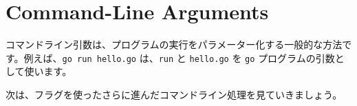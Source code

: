 \section{Command-Line Arguments}

コマンドライン引数は、プログラムの実行をパラメーター化する一般的な方法です。例えば、\texttt{go run hello.go} は、\texttt{run} と \texttt{hello.go} を \texttt{go} プログラムの引数として使います。




次は、フラグを使ったさらに進んだコマンドライン処理を見ていきましょう。
